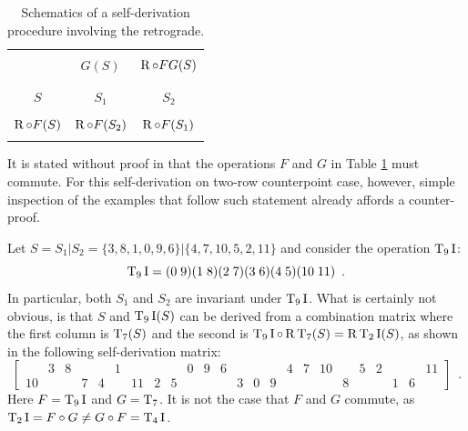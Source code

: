 \begin{table}[htbp]
	\cite[219]{Starr1984}
    \caption[Self-Derivation Involving the Retrograde]{Schematics of a self-derivation procedure involving the retrograde.}
    \label{derivation-self}
    \centering
    \vspace{12pt}
    \begin{tabular}{c|cc}
        \hline\\
        & $G(S)$ & $\operatorname{R} \circ FG(S)$ \\\\
        \hline\\
        $S$ & $S_1$ & $S_2$ \\\\
        $\operatorname{R} \circ F(S)$ & $\operatorname{R} \circ F(S_2)$ & $\operatorname{R} \circ F(S_1)$ \\\\
        \hline
    \end{tabular}
\end{table}

It is stated without proof in \cite[217]{Starr1984} that the operations $F$ and $G$ in Table \ref{derivation-self} must commute. For this self-derivation on two-row counterpoint case, however, simple inspection of the examples that follow such statement already affords a counter-proof.

\begin{example}
	\label{topSquareSideExample}
    \cite[218]{Starr1984}
    Let $S = S_1 | S_2 = \{ 3, 8, 1, 0, 9, 6 \} | \{ 4, 7, 10, 5, 2, 11 \}$ and consider the operation $\operatorname{T}_9\operatorname{I}$:
    \begin{equation}
        \operatorname{T}_9\operatorname{I} = (0 \; 9) (1 \; 8) (2 \; 7) (3 \; 6) (4 \; 5) (10 \; 11) \enspace.
    \end{equation}
    In particular, both $S_1$ and $S_2$ are invariant under $\operatorname{T}_9\operatorname{I}$. What is certainly not obvious, is that $S$ and $\operatorname{T}_9\operatorname{I}(S)$ can be derived from a combination matrix where the first column is $\operatorname{T}_7(S)$ and the second is $\operatorname{T}_9\operatorname{I} \circ \operatorname{R}\operatorname{T}_7(S) = \operatorname{R}\operatorname{T}_2\operatorname{I}(S)$, as shown in the following self-derivation matrix:
    \begin{equation}
    	\label{topSquareSideEquation}
        \left[
        \begin{array}{cccccccccccc|cccccccccccc}
            & 3 & 8 &&& 1 &&&& 0 & 9 & 6 &&&& 4 & 7 & 10 && 5 & 2 &&& 11 \\
            10 &&& 7 & 4 && 11 & 2 & 5 &&&& 3 & 0 & 9 &&&& 8 &&& 1 & 6 &
        \end{array}
        \right] \enspace.
    \end{equation}
    Here $F = \operatorname{T}_9\operatorname{I}$ and $G = \operatorname{T}_7$. It is not the case that $F$ and $G$ commute, as $\operatorname{T}_2\operatorname{I} = F \circ G \ne G \circ F = \operatorname{T}_4\operatorname{I}$.
\end{example}

